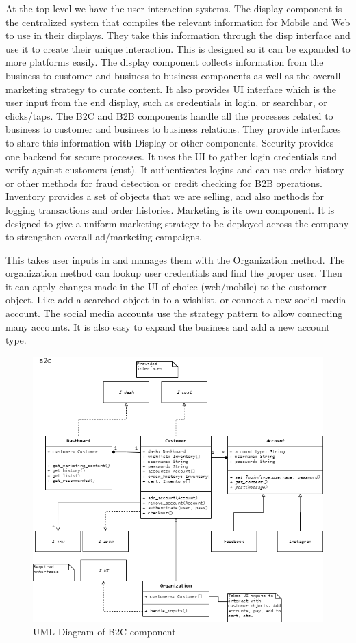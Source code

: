 \documentclass[11pt]{article}
\begin{document}
At the top level we have the user interaction systems. 
The display component is the centralized system that compiles the relevant information for Mobile and Web to use in their displays.
They take this information through the disp interface and use it to create their unique interaction. 
This is designed so it can be expanded to more platforms easily. 
The display component collects information from the business to customer and business to business components as well as the overall marketing strategy to curate content. 
It also provides UI interface which is the user input from the end display, such as credentials in login, or searchbar, or clicks/taps. 
The B2C and B2B components handle all the processes related to business to customer and business to business relations. 
They provide interfaces to share this information with Display or other components. Security provides one backend for secure processes. 
It uses the UI to gather login credentials and verify against customers (cust). 
It authenticates logins and can use order history or other methods for fraud detection or credit checking for B2B operations. 
Inventory provides a set of objects that we are selling, and also methods for logging transactions and order histories. 
Marketing is its own component. It is designed to give a uniform marketing strategy to be deployed across the company to strengthen overall ad/marketing campaigns. 

\newpage
{}

This takes user inputs in and manages them with the Organization method. The organization method can lookup user credentials and find the proper user. Then it can apply changes made in the UI of choice (web/mobile) to the customer object. Like add a searched object in to a wishlist, or connect a new social media account. The social media accounts use the strategy pattern to allow connecting many accounts. It is also easy to expand the business and add a new account type. 

\begin{figure}[H]
    \centering
    \includegraphics[width = \linewidth]{./p3_uml.png}
    \caption{UML Diagram of B2C component}
    \label{fig:uml}
\end{figure}
\end{document}
